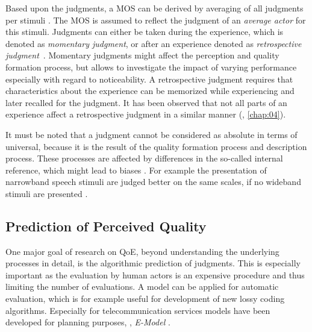 Based upon the judgments, a \acf{MOS} can be derived by averaging of all judgments per stimuli \citep{itu-t_p.800.2:_2013}.
The \ac{MOS} is assumed to reflect the judgment of an \emph{average actor} for this stimuli.
Judgments can either be taken during the experience, which is denoted as \emph{momentary judgment}, or after an experience denoted as \emph{retrospective judgment}~\citep[\cf,][]{weiss_temporal_2014}.
Momentary judgments might affect the perception and quality formation process, but allows to investigate the impact of varying performance especially with regard to noticeability.
A retrospective judgment requires that characteristics about the experience can be memorized while experiencing and later recalled for the judgment.
It has been observed that not all parts of an experience affect a retrospective judgment in a similar manner (\cf, \autoref{chap:04}).

It must be noted that a judgment cannot be considered as absolute in terms of universal, because it is the result of the quality formation process and description process.
These processes are affected by differences in the so-called internal reference, which might lead to biases \citep[\cf,][]{zielinski_biases_2008, pitrey_aligning_2011}.
For example the presentation of narrowband speech stimuli are judged better on the same scales, if no wideband stimuli are presented \citep[\cf,][]{koster_comparison_2015}.

\subsection{Prediction of Perceived Quality}
One major goal of research on \ac{QoE}, beyond understanding the underlying processes in detail, is the algorithmic prediction of judgments.
This is especially important as the evaluation by human actors is an expensive procedure and thus limiting the number of evaluations.
A model can be applied for automatic evaluation, which is for example useful for development of new lossy coding algorithms.
Especially for telecommunication services models have been developed for planning purposes, \eg, \emph{E-Model} \citep{itu-t_g.107:_2014}.


